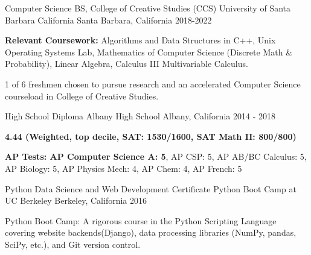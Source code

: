 
\begin{cventries}

  \cventry
  {Computer Science BS, College of Creative Studies (CCS)} %
    {University of Santa Barbara California} %
    {Santa Barbara, California} %
    {2018-2022} %
    {
    \begin{cvitems}
    \item \textbf{Relevant Coursework:} Algorithms and Data Structures in C++, Unix Operating Systems Lab, Mathematics of Computer Science (Discrete Math \& Probability), Linear Algebra, Calculus III Multivariable Calculus.
    \item 1 of 6 freshmen chosen to pursue research and an accelerated Computer Science courseload in College of Creative Studies.
    \end{cvitems}
    }

  \cventry
    {High School Diploma} %
    {Albany High School} %
    {Albany, California} %
    {2014 - 2018} %
    {
    \begin{cvitems}
    \item \textbf{4.44 (Weighted, top decile, SAT: 1530/1600, SAT Math II: 800/800)}
    \item \textbf{AP Tests: AP Computer Science A: 5}, AP CSP: 5, AP AB/BC Calculus: 5, AP Biology: 5, AP Physics Mech: 4, AP Chem: 4, AP French: 5
    \end{cvitems}
    }

 \cventry
    {Python Data Science and Web Development Certificate} %
    {Python Boot Camp at UC Berkeley} %
    {Berkeley, California} %
    {2016} %
    {
      \begin{cvitems}
      \item Python Boot Camp: A rigorous course in the Python Scripting Language covering website backends(Django), data processing libraries (NumPy, pandas, SciPy, etc.), and Git version control.
      \end{cvitems}
      }


\end{cventries}
